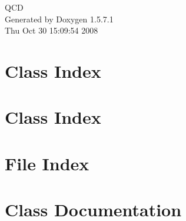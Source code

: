 \documentclass[a4paper]{book}
\begin{document}
\begin{titlepage}
\vspace*{7cm}
\begin{center}
{\Large QCD }\\
\vspace*{1cm}
{\large Generated by Doxygen 1.5.7.1}\\
\vspace*{0.5cm}
{\small Thu Oct 30 15:09:54 2008}\\
\end{center}
\end{titlepage}
\clearemptydoublepage
{}
\tableofcontents
\clearemptydoublepage
{}
\chapter{Class Index}

\chapter{Class Index}

\chapter{File Index}

\chapter{Class Documentation}
















































\end{document}
